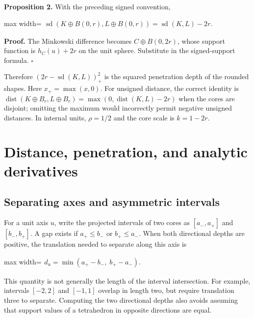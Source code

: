 \documentclass[11pt,a4paper]{article}
\begin{document}
\textbf{Proposition 2.} With the preceding signed convention,

\begin{center}\begin{adjustbox}{max width=\linewidth}$\displaystyle\begin{aligned}
\operatorname{sd}(K\oplus B(0,r),L\oplus B(0,r))
=\operatorname{sd}(K,L)-2r.
\end{aligned}$\end{adjustbox}\end{center}

\textbf{Proof.} The Minkowski difference becomes \(C\oplus B(0,2r)\), whose support function is \(h_C(u)+2r\) on the unit sphere. Substitute in the signed-support formula. \(\square\)

Therefore \((2r-\operatorname{sd}(K,L))_+^2\) is the squared penetration depth of the rounded shapes. Here \(x_+=\max(x,0)\). For unsigned distance, the correct identity is \(\operatorname{dist}(K\oplus B_r,L\oplus B_r)=\max(0,\operatorname{dist}(K,L)-2r)\) when the cores are disjoint; omitting the maximum would incorrectly permit negative unsigned distances. In internal units, \(\rho=1/2\) and the core scale is \(k=1-2r\).

\section{Distance, penetration, and analytic derivatives}

\subsection{Separating axes and asymmetric intervals}

For a unit axis \(u\), write the projected intervals of two cores as \([a_-,a_+]\) and \([b_-,b_+]\). A gap exists if \(a_+\le b_-\) or \(b_+\le a_-\). When both directional depths are positive, the translation needed to separate along this axis is

\begin{center}\begin{adjustbox}{max width=\linewidth}$\displaystyle\begin{aligned}
d_u=\min(a_+-b_-,\;b_+-a_-).
\end{aligned}$\end{adjustbox}\end{center}

This quantity is not generally the length of the interval intersection. For example, intervals \([-2,2]\) and \([-1,1]\) overlap in length two, but require translation three to separate. Computing the two directional depths also avoids assuming that support values of a tetrahedron in opposite directions are equal.
\end{document}
